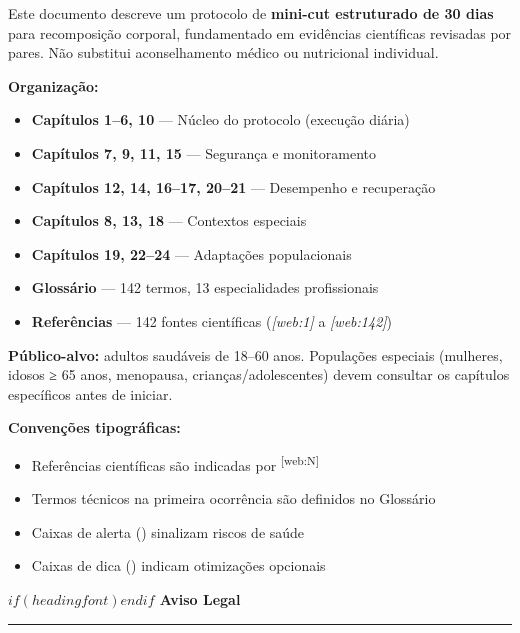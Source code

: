 \documentclass[$if(fontsize)$$fontsize$,$endif$a4paper]{article}
\begin{document}
\noindent Este documento descreve um protocolo de \textbf{mini-cut estruturado de 30 dias}
para recomposição corporal, fundamentado em evidências científicas revisadas por pares.
Não substitui aconselhamento médico ou nutricional individual.

\vspace{0.8em}
\noindent\textbf{Organização:}
\begin{itemize}[itemsep=2pt, topsep=4pt]
  \item \textbf{Capítulos 1–6, 10} — Núcleo do protocolo (execução diária)
  \item \textbf{Capítulos 7, 9, 11, 15} — Segurança e monitoramento
  \item \textbf{Capítulos 12, 14, 16–17, 20–21} — Desempenho e recuperação
  \item \textbf{Capítulos 8, 13, 18} — Contextos especiais
  \item \textbf{Capítulos 19, 22–24} — Adaptações populacionais
  \item \textbf{Glossário} — 142 termos, 13 especialidades profissionais
  \item \textbf{Referências} — 142 fontes científicas (\textit{[web:1]} a \textit{[web:142]})
\end{itemize}

\vspace{0.8em}
\noindent\textbf{Público-alvo:} adultos saudáveis de 18–60 anos. Populações especiais
(mulheres, idosos ≥ 65 anos, menopausa, crianças/adolescentes) devem consultar os
capítulos específicos antes de iniciar.

\vspace{0.8em}
\noindent\textbf{Convenções tipográficas:}
\begin{itemize}[itemsep=2pt, topsep=4pt]
  \item Referências científicas são indicadas por \textsuperscript{\small\color{AccentFg}[web:N]}
  \item Termos técnicos na primeira ocorrência são definidos no Glossário
  \item Caixas de alerta (\textcolor{red!70!black}{\faExclamationTriangle}) sinalizam riscos de saúde
  \item Caixas de dica (\textcolor{green!50!black}{\faLightbulb}) indicam otimizações opcionais
\end{itemize}

\newpage

\thispagestyle{empty}
\vspace*{3cm}
\begin{center}
  {\Large\bfseries\color{HeadingFg}$if(headingfont)$\headingfontfamily$endif$ Aviso Legal\par}
  \vspace{0.5cm}
  {\textcolor{AccentFg}{\rule{0.3\linewidth}{0.8pt}}\par}
\end{center}
\vspace{1cm}
\end{document}
